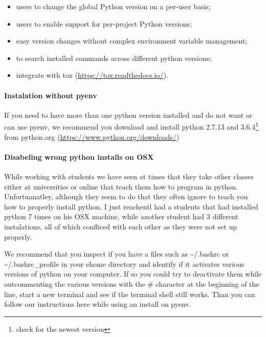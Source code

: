 \begin{itemize}

\item
  users to change the global Python version on a per-user basis;
\item
  users to enable support for per-project Python versions;
\item
  easy version changes without complex environment variable management;
\item
  to search installed commands across different python versions;
\item
  integrate with tox (\url{https://tox.readthedocs.io/}).
\end{itemize}

\paragraph{Instalation without pyenv}\label{instalation-without-pyenv}

If you need to have more than one python version installed and do not
want or can use pyenv, we recommend you download and install python
2.7.13 and 3.6.4\footnote{check
  for the newest version} from python.org
(\url{https://www.python.org/downloads/})

\paragraph{Disabeling wrong python installs on
OSX}\label{disabeling-wrong-python-installs-on-osx}

While working with students we have seen at times that they take other
classes either at universities or online that teach them how to program
in python. Unfortuanatley, although they seem to do that they often
ignore to teach you how to properly install python. I just reachentl had
a students that had installed python 7 times on his OSX machine, while
another student had 3 different instalations, all of which confliced
with each other as they were not set up properly.

We recommend that you inspect if you have a files such as
\textasciitilde{}/.bashrc or \textasciitilde{}/.bashrc\_profile in your
ehome directory and identify if it activates various versions of python
on your computer. If so you could try to deactivate them while
outcommenting the various versions with the \# character at the
beginning of the line, start a new terminal and see if the terminal
shell still works. Than you can follow our instructions here while using
an install on pyenv.

